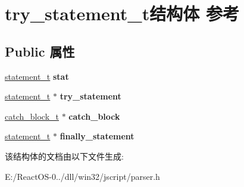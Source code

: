 \hypertarget{structtry__statement__t}{}\section{try\+\_\+statement\+\_\+t结构体 参考}
\label{structtry__statement__t}
\subsection*{Public 属性}
\begin{DoxyCompactItemize}
\item 
\mbox{\label{structtry__statement__t_a07b53ce8ba2306c134c52c938c32f845}} 
\hyperlink{struct__statement__t}{statement\+\_\+t} {\bfseries stat}
\item 
\mbox{\label{structtry__statement__t_af41a16b0f07959c72d5accf22c216519}} 
\hyperlink{struct__statement__t}{statement\+\_\+t} $\ast$ {\bfseries try\+\_\+statement}
\item 
\mbox{\label{structtry__statement__t_a3e32502b1e26ceec693d122aaf369b2e}} 
\hyperlink{structcatch__block__t}{catch\+\_\+block\+\_\+t} $\ast$ {\bfseries catch\+\_\+block}
\item 
\mbox{\label{structtry__statement__t_af9683ab966b252f73928fcdd1f59b759}} 
\hyperlink{struct__statement__t}{statement\+\_\+t} $\ast$ {\bfseries finally\+\_\+statement}
\end{DoxyCompactItemize}


该结构体的文档由以下文件生成\+:\begin{DoxyCompactItemize}
\item 
E\+:/\+React\+O\+S-\/0../dll/win32/jscript/parser.\+h\end{DoxyCompactItemize}
